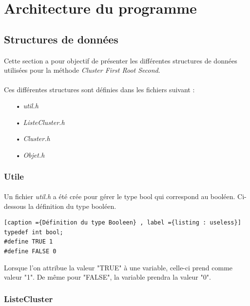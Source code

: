 \documentclass[twoside,UTF8]{EPURapport}
\begin{document}
\section{Architecture du programme}

\subsection{Structures de données}
\label{subsec:struct}

\paragraph{} Cette section a pour objectif de présenter les différentes structures de données utilisées pour la méthode \textit{Cluster First Root Second}.

\paragraph{}Ces différentes structures sont définies dans les fichiers suivant : 
\begin{itemize}
\item[•] \textit{util.h}
\item[•]\textit{ListeCluster.h}
\item[•]\textit{Cluster.h}
\item[•]\textit{Objet.h}
\end{itemize}
\subsubsection{Utile}

\paragraph{}
Un fichier \textit{util.h} a été crée pour gérer le type bool qui correspond au booléen. 
Ci-dessous la définition du type booléen. 
\begin{lstlisting}[caption ={Définition du type Booleen} , label ={listing : useless}]
typedef int bool;
#define TRUE 1
#define FALSE 0
\end{lstlisting}

Lorsque l'on attribue la valeur "TRUE" à une variable, celle-ci prend comme valeur "1". De m\^eme pour "FALSE", la variable prendra la valeur "0".


\subsubsection{ListeCluster}
\end{document}
